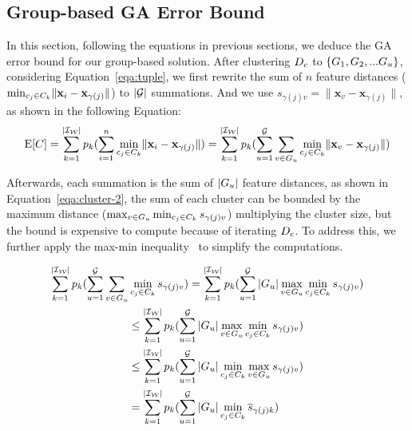 




\subsection{Group-based GA Error Bound}

In this section, following the equations in previous sections, we deduce the GA error bound for our group-based solution. 
%
After clustering $D_c$ to $\{ G_1 , G_2, ...G_u\}$, considering Equation~\ref{eqa:tuple}, we  first rewrite the sum of $n$ feature distances (\ie $\min_{c_j\in C_k}\lVert\mathbf{x}_i - \mathbf{x}_{\gamma(j)}\rVert$) to   $|\mathcal{G}|$ summations. And we use $s_{\gamma(j)v} = \lVert\mathbf{x}_v - \mathbf{x}_{\gamma(j)}\rVert$, as shown in the following Equation:
\vspace{-0.5em}
\begin{equation}\label{eqa:cluster-1}
    \mathrm{E}[C] = \sum_{k= 1}^{|\mathcal{I_W}|} p_k (\sum_{i=1}^n \min_{c_j\in C_k}\lVert\mathbf{x}_i - \mathbf{x}_{\gamma(j)}\rVert) =  \sum_{k= 1}^{|\mathcal{I_W}|} p_k (\sum_{u=1}^{\mathcal{G}}\sum_{v \in G_u} \min_{c_j\in C_k}\lVert\mathbf{x}_v - \mathbf{x}_{\gamma(j)}\rVert)
\end{equation}

Afterwards, each summation is the sum of $|G_u|$ feature distances, as shown in Equation~\ref{eqa:cluster-2},  the sum of each cluster can be bounded by  the maximum distance ($\max_{v \in G_u} \min_{c_j\in C_k} s_{\gamma(j)v}$)  multiplying the  cluster size, but the bound is expensive to compute because of iterating $D_c$. To address this, we further apply the max-min inequality~\cite{} to simplify the computations. 


\begin{equation}\label{eqa:cluster-2}
    \begin{aligned}
        \sum_{k= 1}^{|\mathcal{I_W}|} p_k (\sum_{u=1}^{\mathcal{G}}\sum_{v \in G_u} &\min_{c_j\in C_k} s_{\gamma(j)v}) = \sum_{k= 1}^{|\mathcal{I_W}|} p_k (\sum_{u=1}^{\mathcal{G}} |G_u| \max_{v \in G_u} \min_{c_j\in C_k}s_{\gamma(j)v}) \\
        & \leq \sum_{k= 1}^{|\mathcal{I_W}|} p_k (\sum_{u=1}^{\mathcal{G}} |G_u| \max_{v \in G_u} \min_{c_j\in C_k} s_{\gamma(j)v}) \\
        & \leq \sum_{k= 1}^{|\mathcal{I_W}|} p_k (\sum_{u=1}^{\mathcal{G}} |G_u| \min_{c_j\in C_k} \max_{v \in G_u}s_{\gamma(j)v}) \\
        & =  \sum_{k= 1}^{|\mathcal{I_W}|} p_k (\sum_{u=1}^{\mathcal{G}} |G_u| \min_{c_j\in C_k} \overline{s}_{\gamma(j)k})
    \end{aligned}
\end{equation}




